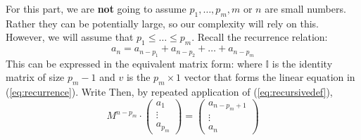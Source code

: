 \documentclass[10pt]{article}
\theoremstyle{plain}
\theoremstyle{definition}
\numberwithin{equation}{section}
\numberwithin{figure}{section}
\begin{document}
\noindent For this part, we are \textbf{not} going to assume $p_1, \ldots, p_m, m$ or $n$ are small numbers. Rather they can be potentially large, so our complexity will rely on this. However, we will assume that $p_1 \leq \ldots \leq p_m$. Recall the recurrence relation:
\begin{equation}
a_n = a_{n - p_1} + a_{n - p_2} + \ldots + a_{n - p_m} \label{eq:recurrence}
\end{equation}
This can be expressed in the equivalent matrix form:
where $\mathbb{I}$ is the identity matrix of size $p_m - 1$ and $v$ is the $p_m \times 1$ vector that forms the linear equation in (\ref{eq:recurrence}). Write 
Then, by repeated application of (\ref{eq:recursivedef}),
\begin{equation}
M^{n - p_m} \cdot \begin{pmatrix} a_{1} \\ \vdots \\ a_{p_m} \end{pmatrix} = \begin{pmatrix} a_{n - p_m + 1} \\ \vdots \\ a_{n} \end{pmatrix}
\end{equation}
\end{document}

